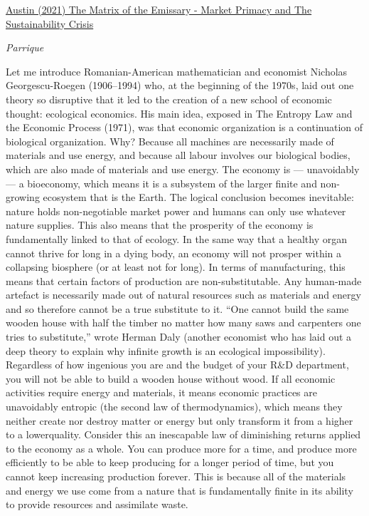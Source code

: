 \documentclass[
]{book}
\begin{document}
\href{https://channelmcgilchrist.com/articles/the-matrix-of-the-emissary/}{Austin (2021) The Matrix of the Emissary - Market Primacy and The Sustainability Crisis}

\emph{Parrique}

Let me introduce
Romanian-American mathematician and economist Nicholas Georgescu-Roegen
(1906--1994) who, at the beginning of the 1970s, laid out one theory so disruptive that
it led to the creation of a new school of economic thought: ecological economics. His
main idea, exposed in The Entropy Law and the Economic Process (1971), was that
economic organization is a continuation of biological organization. Why? Because all
machines are necessarily made of materials and use energy, and because all labour
involves our biological bodies, which are also made of materials and use energy. The
economy is --- unavoidably --- a bioeconomy, which means it is a subsystem of the larger
finite and non-growing ecosystem that is the Earth.
The logical conclusion becomes inevitable: nature holds non-negotiable market power
and humans can only use whatever nature supplies. This also means that the prosperity
of the economy is fundamentally linked to that of ecology. In the same way that a
healthy organ cannot thrive for long in a dying body, an economy will not prosper
within a collapsing biosphere (or at least not for long). In terms of manufacturing, this
means that certain factors of production are non-substitutable. Any human-made
artefact is necessarily made out of natural resources such as materials and energy and
so therefore cannot be a true substitute to it. ``One cannot build the same wooden house
with half the timber no matter how many saws and carpenters one tries to substitute,''
wrote Herman Daly (another economist who has laid out a deep theory to explain why
infinite growth is an ecological impossibility). Regardless of how ingenious you are and
the budget of your R\&D department, you will not be able to build a wooden house
without wood.
If all economic activities require energy and materials, it means economic practices are
unavoidably entropic (the second law of thermodynamics), which means they neither
create nor destroy matter or energy but only transform it from a higher to a lowerquality. Consider this an inescapable law of diminishing returns applied to the economy
as a whole. You can produce more for a time, and produce more efficiently to be able to
keep producing for a longer period of time, but you cannot keep increasing production
forever. This is because all of the materials and energy we use come from a nature that
is fundamentally finite in its ability to provide resources and assimilate waste.
\end{document}

